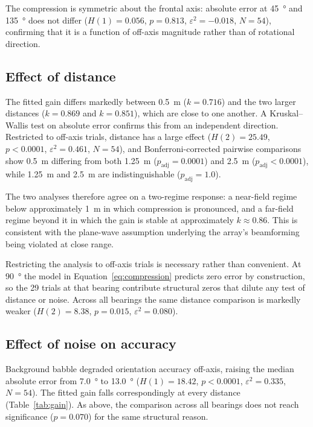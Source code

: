 The compression is symmetric about the frontal axis: absolute error at
\SI{45}{\degree} and \SI{135}{\degree} does not differ
($H(1) = 0.056$, $p = 0.813$, $\varepsilon^2 = -0.018$, $N = 54$), confirming
that it is a function of off-axis magnitude rather than of rotational
direction.

\subsection{Effect of distance}

The fitted gain differs markedly between \SI{0.5}{\metre} ($k = 0.716$) and the
two larger distances ($k = 0.869$ and $k = 0.851$), which are close to one
another. A Kruskal--Wallis test on absolute error confirms this from an
independent direction. Restricted to off-axis trials, distance has a large
effect ($H(2) = 25.49$, $p < 0.0001$, $\varepsilon^2 = 0.461$, $N = 54$), and
Bonferroni-corrected pairwise comparisons show \SI{0.5}{\metre} differing from
both \SI{1.25}{\metre} ($p_{\text{adj}} = 0.0001$) and \SI{2.5}{\metre}
($p_{\text{adj}} < 0.0001$), while \SI{1.25}{\metre} and \SI{2.5}{\metre} are
indistinguishable ($p_{\text{adj}} = 1.0$).

The two analyses therefore agree on a two-regime response: a near-field regime
below approximately \SI{1}{\metre} in which compression is pronounced, and a
far-field regime beyond it in which the gain is stable at approximately
$k \approx 0.86$. This is consistent with the plane-wave assumption underlying
the array's beamforming being violated at close range.

Restricting the analysis to off-axis trials is necessary rather than
convenient. At \SI{90}{\degree} the model in Equation~\ref{eq:compression}
predicts zero error by construction, so the 29 trials at that bearing
contribute structural zeros that dilute any test of distance or noise. Across
all bearings the same distance comparison is markedly weaker
($H(2) = 8.38$, $p = 0.015$, $\varepsilon^2 = 0.080$).

\subsection{Effect of noise on accuracy}

Background babble degraded orientation accuracy off-axis, raising the median
absolute error from \SI{7.0}{\degree} to \SI{13.0}{\degree}
($H(1) = 18.42$, $p < 0.0001$, $\varepsilon^2 = 0.335$, $N = 54$). The fitted
gain falls correspondingly at every distance (Table~\ref{tab:gain}). As above,
the comparison across all bearings does not reach significance
($p = 0.070$) for the same structural reason.

